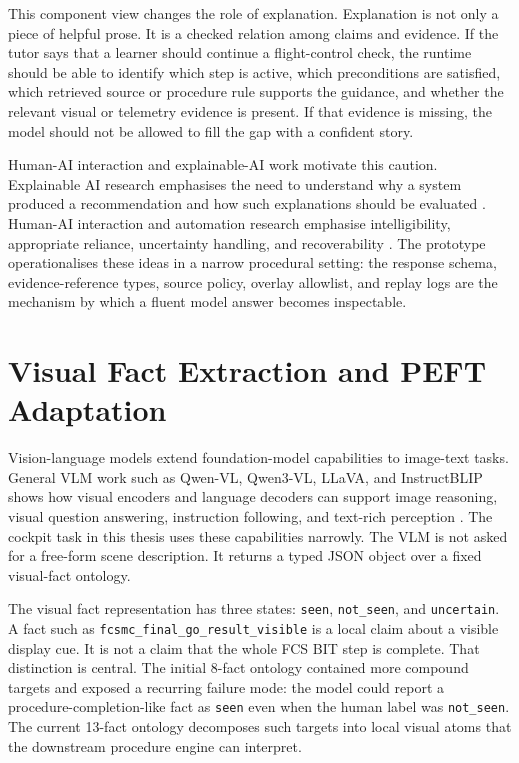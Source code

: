 This component view changes the role of explanation. Explanation is not only a
piece of helpful prose. It is a checked relation among claims and evidence. If
the tutor says that a learner should continue a flight-control check, the
runtime should be able to identify which step is active, which preconditions
are satisfied, which retrieved source or procedure rule supports the guidance,
and whether the relevant visual or telemetry evidence is present. If that
evidence is missing, the model should not be allowed to fill the gap with a
confident story.

Human-AI interaction and explainable-AI work motivate this caution. Explainable
AI research emphasises the need to understand why a system produced a
recommendation and how such explanations should be evaluated
\citep{gunning2019xai,hoffman2018metrics}. Human-AI interaction and automation
research emphasise intelligibility, appropriate reliance, uncertainty
handling, and recoverability \citep{lee2004trust,amershi2019guidelines}.
The prototype operationalises these ideas in a narrow procedural setting: the
response schema, evidence-reference types, source policy, overlay allowlist,
and replay logs are the mechanism by which a fluent model answer becomes
inspectable.

\section{Visual Fact Extraction and PEFT Adaptation}\label{sec:bg-vlm}

Vision-language models extend foundation-model capabilities to image-text
tasks. General VLM work such as Qwen-VL, Qwen3-VL, LLaVA, and InstructBLIP
shows how visual encoders and language decoders can support image reasoning,
visual question answering, instruction following, and text-rich perception
\citep{bai2023qwen,qwen3vl2025,liu2023llava,dai2023instructblip}. The cockpit
task in this thesis uses these capabilities narrowly. The VLM is not asked for
a free-form scene description. It returns a typed JSON object over a fixed
visual-fact ontology.

The visual fact representation has three states:
\texttt{seen}, \texttt{not\_seen}, and \texttt{uncertain}. A fact such as
\texttt{fcsmc\_final\_go\_result\_visible} is a local claim about a visible
display cue. It is not a claim that the whole FCS BIT step is complete. That
distinction is central. The initial 8-fact ontology contained more compound
targets and exposed a recurring failure mode: the model could report a
procedure-completion-like fact as \texttt{seen} even when the human label was
\texttt{not\_seen}. The current 13-fact ontology decomposes such targets into
local visual atoms that the downstream procedure engine can interpret.

